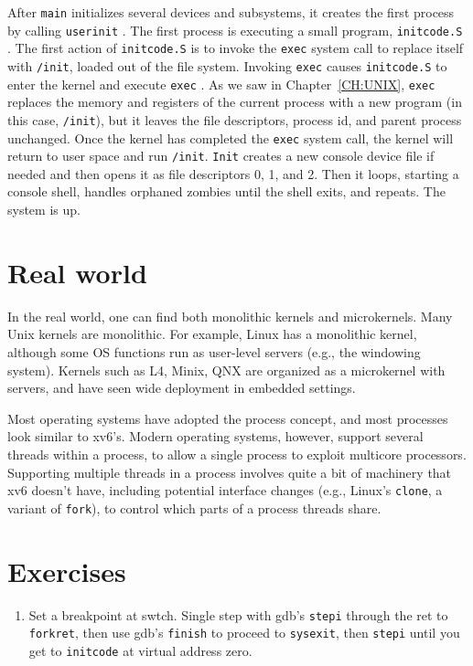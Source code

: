 After
\lstinline{main}
initializes several devices and subsystems, 
it creates the first process by calling 
\lstinline{userinit}
.
The first process is executing a small program,
\lstinline{initcode.S} 
.
The first action of 
\lstinline{initcode.S}
is to invoke  the
\lstinline{exec}
system call to replace itself with
\lstinline{/init},
loaded out of the file system.
Invoking
\lstinline{exec}
causes
\lstinline{initcode.S}
to enter the kernel and execute
\lstinline{exec}
.
As we saw in Chapter~\ref{CH:UNIX}, 
\lstinline{exec}
replaces the memory and registers of the
current process with a new program (in this case,
\lstinline{/init}),
but it leaves the
file descriptors, process id, and parent process unchanged.
Once the kernel has completed the
\lstinline{exec}
system call, the kernel will return to user space and run
\lstinline{/init}.
\lstinline{Init}
creates a new console device file
if needed
and then opens it as file descriptors 0, 1, and 2.
Then it loops,
starting a console shell, 
handles orphaned zombies until the shell exits,
and repeats.
The system is up.
\section{Real world}

In the real world, one can find both monolithic kernels and microkernels. Many
Unix kernels are monolithic. For example, Linux has a monolithic kernel,
although some OS functions run as user-level servers (e.g., the windowing
system).  Kernels such as L4, Minix, QNX are organized as a microkernel with
servers, and have seen wide deployment in embedded settings.

Most operating systems have adopted the process concept, and most
processes look similar to xv6's.  Modern operating systems, however,
support several threads within a process, to allow a single process to
exploit multicore processors.  Supporting multiple threads in a
process involves quite a bit of machinery that xv6 doesn't have,
including potential interface changes (e.g., Linux's
\lstinline{clone},
a variant of
\lstinline{fork}),
to control which parts of
a process threads share.
\section{Exercises}

\begin{enumerate}
  
\item Set a breakpoint at swtch.  Single step with gdb's
\lstinline{stepi}
through the ret to
\lstinline{forkret},
then use gdb's
\lstinline{finish}
to proceed to
\lstinline{sysexit},
then
\lstinline{stepi}
until you get to
\lstinline{initcode} 
at virtual address zero.

\end{enumerate}
